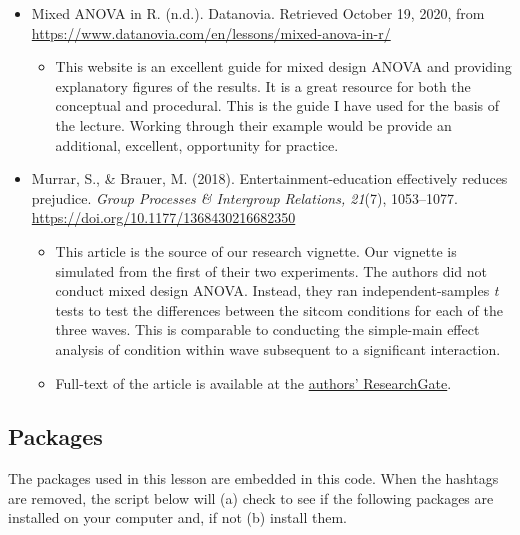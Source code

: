 \documentclass[
  11pt,
]{book}
\providecommand{\tightlist}{%
  \setlength{\itemsep}{0pt}\setlength{\parskip}{0pt}}
\begin{document}
\begin{itemize}
\tightlist
\item
  Mixed ANOVA in R. (n.d.). Datanovia. Retrieved October 19, 2020, from \url{https://www.datanovia.com/en/lessons/mixed-anova-in-r/}

  \begin{itemize}
  \tightlist
  \item
    This website is an excellent guide for mixed design ANOVA and providing explanatory figures of the results. It is a great resource for both the conceptual and procedural. This is the guide I have used for the basis of the lecture. Working through their example would be provide an additional, excellent, opportunity for practice.
  \end{itemize}
\item
  Murrar, S., \& Brauer, M. (2018). Entertainment-education effectively reduces prejudice. \emph{Group Processes \& Intergroup Relations, 21}(7), 1053--1077. \url{https://doi.org/10.1177/1368430216682350}

  \begin{itemize}
  \tightlist
  \item
    This article is the source of our research vignette. Our vignette is simulated from the first of their two experiments. The authors did not conduct mixed design ANOVA. Instead, they ran independent-samples \emph{t} tests to test the differences between the sitcom conditions for each of the three waves. This is comparable to conducting the simple-main effect analysis of condition within wave subsequent to a significant interaction.
  \item
    Full-text of the article is available at the \href{https://www.researchgate.net/publication/312177602_Entertainment-education_effectively_reduces_prejudice}{authors' ResearchGate}.
  \end{itemize}
\end{itemize}

\hypertarget{packages-6}{%
\subsection{Packages}\label{packages-6}}

The packages used in this lesson are embedded in this code. When the hashtags are removed, the script below will (a) check to see if the following packages are installed on your computer and, if not (b) install them.
\end{document}
